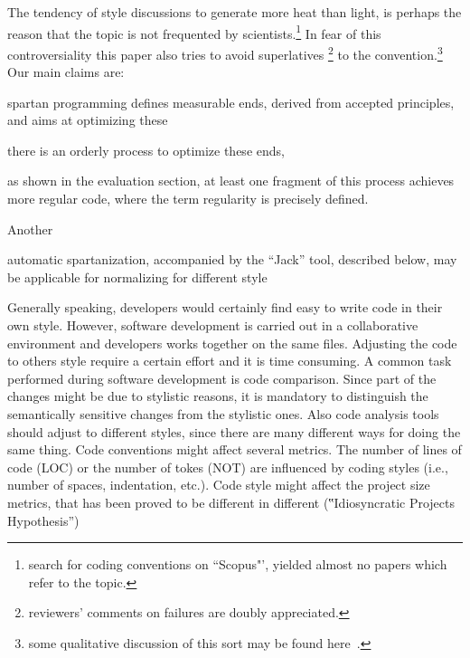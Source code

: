 The tendency of style discussions to generate more heat than light, is perhaps
the reason that the topic is not frequented by scientists.\footnote{%
  search for coding conventions on ``Scopus"', yielded almost no papers which
refer to the topic.} In fear of this controversiality this paper also tries to
avoid  superlatives \footnote{reviewers' comments on failures are doubly
  appreciated.} to the convention.\footnote{some qualitative discussion of this 
  sort may be found here~\cite{Gil:2010}.} Our main claims are: 
\begin{enumrate}
    \item spartan programming defines measurable ends, derived from 
      accepted principles, and aims at optimizing these
    \item there is an orderly process to optimize these ends, 
    \item as shown in the evaluation section, at least one fragment of this
      process achieves more regular code, where the term regularity is
      precisely defined.
\end{enumrate}

Another
\item automatic spartanization, accompanied by the ``Jack'' tool,
        described below, may be applicable for normalizing for different
        style

Generally speaking, developers would certainly find easy to write code in their own style.
However, software development is carried out in a collaborative environment and developers
works together on the same files. Adjusting the code to others style require a certain effort
and it is time consuming. A common task performed during software development is code comparison.
Since part of the changes might be due to stylistic reasons, it is mandatory to distinguish the
semantically sensitive changes from the stylistic ones.
Also code analysis tools should adjust to different styles, since there are many
different ways for doing the same thing.
Code conventions might affect several metrics. The number of lines of code
(LOC) or the number of tokes (NOT) are influenced by coding styles (i.e.,
number of spaces, indentation, etc.). Code style might affect the project size
metrics, that has been proved to be different in different (‟Idiosyncratic
Projects
Hypothesis”)~\cite{Gil:Lalouche:16}~\cite{Gil:2011:Goldstein:Moshkovich:2011}


